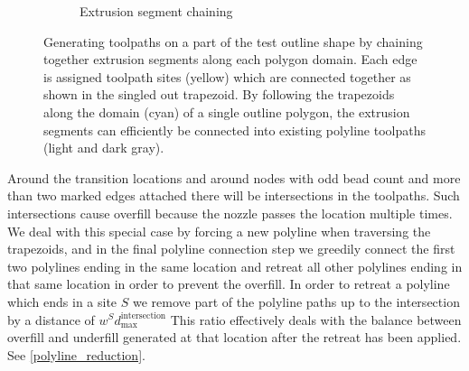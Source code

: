 \begin{figure}
\begin{subfigure}{.45\columnwidth}
\caption{Extrusion segment chaining}\label{segment_generation_chaining}
\end{subfigure}
\caption{
Generating toolpaths on a part of the test outline shape by chaining together extrusion segments along each polygon domain.
Each edge is assigned toolpath sites (yellow) which are connected together as shown in the singled out trapezoid.
By following the trapezoids along the domain (cyan) of a single outline polygon,
the extrusion segments can efficiently be connected into existing polyline toolpaths (light and dark gray).
}
\label{segment_generation}
\end{figure}


Around the transition locations and around nodes with odd bead count and more than two marked edges attached there will be intersections in the toolpaths.
Such intersections cause overfill because the nozzle passes the location multiple times.
We deal with this special case by forcing a new polyline when traversing the trapezoids, and in the final polyline connection step we greedily connect the first two polylines ending in the same location and retreat all other polylines ending in that same location in order to prevent the overfill.
In order to retreat a polyline which ends in a site $S$ we remove part of the polyline paths up to the intersection by a distance of $w^S d_\text{max}^\text{intersection}$
This ratio effectively deals with the balance between overfill and underfill generated at that location after the retreat has been applied.
See \cref{polyline_reduction}.


